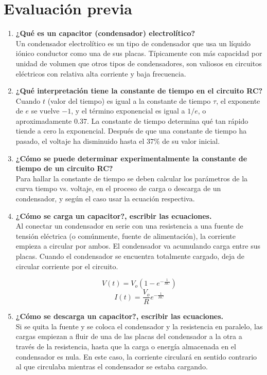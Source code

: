 \documentclass[letter,11pt]{article}
\begin{document}
\section{Evaluación previa}
\begin{enumerate}
\item \textbf{¿Qué es un capacitor (condensador) electrolítico?} \\
Un condensador electrolítico es un tipo de condensador que usa un líquido
iónico conductor como una de sus placas. Típicamente con más capacidad por
unidad de volumen que otros tipos de condensadores, son valiosos en circuitos
eléctricos con relativa alta corriente y baja frecuencia.

\item \textbf{¿Qué interpretación tiene la constante de tiempo en el circuito
RC?} \\
Cuando $t$ (valor del tiempo) es igual a la constante de tiempo $\tau$, el
exponente de $e$ se vuelve $- 1$, y el término exponencial es igual a $1/e$, o
aproximadamente $0.37$. La constante de tiempo determina qué tan rápido tiende a
cero la exponencial. Después de que una constante de tiempo ha pasado, el
voltaje ha disminuido hasta el $37\%$ de su valor inicial.

\item \textbf{¿Cómo se puede determinar experimentalmente la constante de tiempo
de un circuito RC?} \\
Para hallar la constante de tiempo se deben calcular los parámetros de la curva
tiempo vs. voltaje, en el proceso de carga o descarga de un condensador, y según
el caso usar la ecuación respectiva.

\item \textbf{¿Cómo se carga un capacitor?, escribir las ecuaciones.} \\
Al conectar un condensador en serie con una resistencia a una fuente de tensión
eléctrica (o comúnmente, fuente de alimentación), la corriente empieza a
circular por ambos. El condensador va acumulando carga entre sus placas. Cuando
el condensador se encuentra totalmente cargado, deja de circular corriente por
el circuito.

\begin{equation*}
    V(t) = V_o ( 1 - e^{-\frac{1}{RC}} )
\end{equation*}
\begin{equation*}
    I(t) = \frac{V_o}{R} e^{-\frac{1}{RC}}
\end{equation*}

\item \textbf{¿Cómo se descarga un capacitor?, escribir las ecuaciones.} \\
Si se quita la fuente y se coloca el condensador y la resistencia en paralelo,
las cargas empiezan a fluir de una de las placas del condensador a la otra a
través de la resistencia, hasta que la carga o energía almacenada en el
condensador es nula. En este caso, la corriente circulará en sentido contrario
al que circulaba mientras el condensador se estaba cargando.


\end{enumerate}
\end{document}
